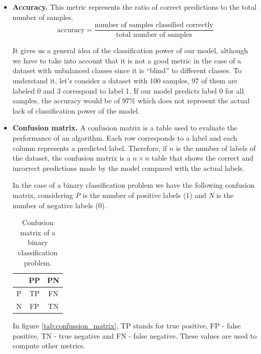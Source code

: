 \begin{itemize}
    \item \textbf{Accuracy.} This metric represents the ratio of correct predictions to the total number of samples.
    \begin{equation}
        \text{accuracy} = \frac{\text{number of samples classified correctly}}{\text{total number of samples}}
    \end{equation}

    It gives us a general idea of the classification power of our model, although we have to take into account that it is not a good metric in the case of a dataset with unbalanced classes since it is ``blind'' to different classes. To understand it, let's consider a dataset with 100 samples, 97 of them are labeled 0 and 3 correspond to label 1. If our model predicts label 0 for all samples, the accuracy would be of 97\% which does not represent the actual lack of classification power of the model. 
    
    \item \textbf{Confusion matrix.} 
    A confusion matrix is a table used to evaluate the performance of an algorithm. Each row corresponds to a label and each column represents a predicted label. Therefore, if $n$ is the number of labels of the dataset, the confusion matrix is a $n \times n$ table that shows the correct and incorrect predictions made by the model compared with the actual labels.

    In the case of a binary classification problem we have the following confusion matrix, considering \textit{P} is the number of positive labels (1) and \textit{N} is the number of negative labels (0). 

    
    
    \begin{table}
        \centering
        \setlength{\tabcolsep}{10pt} %
        \renewcommand{\arraystretch}{1.5} %
        \begin{tabular}{|c|cc|}
            \hline
             & PP  & PN \\
             \hline
            P & TP & FN\\
            N & FP & TN\\
            \hline
        \end{tabular}
        \caption{Confusion matrix of a binary classification problem.}
        \label{tab:confussion_matrix}
    \end{table}
    In figure \autoref{tab:confussion_matrix}, TP stands for true positive, FP - false positive, TN - true negative and FN - false negative. These values are used to compute other metrics.
    

\end{itemize}
